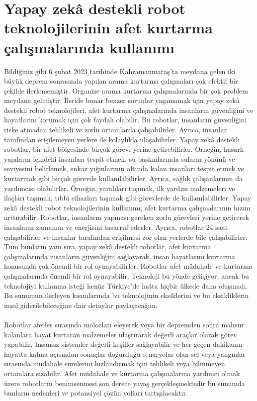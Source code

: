 \documentclass{article}
\begin{document}
\section*{Yapay zekâ destekli robot teknolojilerinin afet kurtarma çalışmalarında kullanımı}
Bildiğiniz gibi 6 şubat 2023 tarihinde Kahramanmaraş’ta meydana gelen iki büyük deprem sonrasında yapılan arama kurtarma çalışmaları çok efektif bir şekilde ilerlememiştir. Organize arama kurtarma çalışmalarında bir çok problem meydana gelmiştir. İleride bunar benzer sorunlar yaşamamak için yapay zekâ destekli robot teknolojileri, afet kurtarma çalışmalarında insanların güvenliğini ve hayatlarını korumak için çok faydalı olabilir. Bu robotlar, insanların güvenliğini riske atmadan tehlikeli ve zorlu ortamlarda çalışabilirler. Ayrıca, insanlar tarafından erişilemeyen yerlere de kolaylıkla ulaşabilirler. Yapay zekâ destekli robotlar, bir afet bölgesinde birçok görevi yerine getirebilirler. Örneğin, hasarlı yapıların içindeki insanları tespit etmek, su baskınlarında suların yönünü ve seviyesini belirlemek, enkaz yığınlarının altında kalan insanları tespit etmek ve kurtarmak gibi birçok görevde kullanılabilirler. Ayrıca, sağlık çalışanlarının da yardımcısı olabilirler. Örneğin, yaralıları taşımak, ilk yardım malzemeleri ve ilaçları taşımak, tıbbi cihazları taşımak gibi görevlerde de kullanılabilirler. Yapay zekâ destekli robot teknolojilerinin kullanımı, afet kurtarma çalışmalarının hızını arttırabilir. Robotlar, insanların yapması gereken zorlu görevleri yerine getirerek insanların zamanını ve enerjisini tasarruf ederler. Ayrıca, robotlar 24 saat çalışabilirler ve insanlar tarafından erişilmesi zor olan yerlerde bile çalışabilirler. Tüm bunların yanı sıra, yapay zekâ destekli robotlar, afet kurtarma çalışmalarında insanların güvenliğini sağlayarak, insan hayatlarını kurtarma konusunda çok önemli bir rol oynayabilirler. Robotlar afet müdahale ve kurtarma çalışmalarında önemli bir rol oynayabilir. Teknoloji bu yönde gelişiyor, ancak bu teknolojiyi kullanma isteği henüz Türkiye’de hatta hiçbir ülkede daha oluşmadı. Bu sunumun ilerleyen kısımlarında bu teknolojinin eksiklerini ve bu eksikliklerin nasıl giderilebileceğine dair detaylar paylaşacağım.
\\ \\
Robotlar afetler sırasında molozları eleyerek veya bir depremden sonra mahsur kalanlara hayat kurtaran malzemeler ulaştırarak değerli araçlar olarak görev yapabilir. İnsansız sistemler değerli keşifler sağlayabilir ve her geçen dakikanın hayatta kalma açısından sonuçlar doğurduğu senaryolar olan sel veya yangınlar sırasında müdahale sürelerini hızlandırmak için tehlikeli veya bilinmeyen ortamlara sızabilir. Afet müdahale ve kurtarma çalışmalarına yardımcı olmak üzere robotların benimsenmesi son derece yavaş gerçekleşmektedir bu sunumda bunların nedenleri ve potansiyel çözün yolları tartışılacaktır. 
\end{document}
